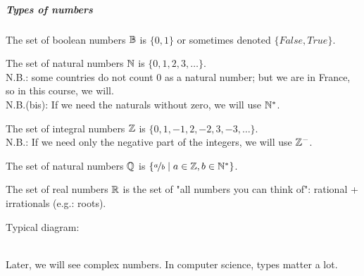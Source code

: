 \subparagraph{Types of numbers}
\begin{definition}[Booleans]
    The set of boolean numbers $\mathbb{B}$ is $\{0,1\}$ or sometimes denoted $\{False, True\}$.\\
\end{definition}
\begin{definition}[Naturals]
    The set of natural numbers $\mathbb{N}$ is $\{0,1,2,3,\dots\}$.\\
    N.B.: some countries do not count $0$ as a natural number; but we are in France, so in this course, we will.\\
    N.B.(bis): If we need the naturals without zero, we will use $\mathbb{N}^*$.
\end{definition}
\begin{definition}[Integers]
    The set of integral numbers $\mathbb{Z}$ is $\{0,1,-1,2,-2,3,-3,\dots\}$.\\
    N.B.: If we need only the negative part of the integers, we will use $\mathbb{Z}^-$.
\end{definition}
\begin{definition}
    The set of natural numbers $\mathbb{Q}$ is $\{\nicefrac{a}{b} \mid a \in \mathbb{Z}, b \in \mathbb{N}^*\}$.\\
\end{definition}
\begin{definition}[Reals]
    The set of real numbers $\mathbb{R}$ is the set of "all numbers you can think of": rational + irrationals (e.g.: roots). 
\end{definition}
Typical diagram:\\
\\
Later, we will see complex numbers.
In computer science, types matter a lot.

